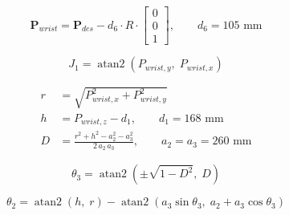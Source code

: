 \documentclass[border=10pt]{standalone}
\begin{document}
\[
\mathbf{P}_{wrist} = \mathbf{P}_{des} - d_6 \cdot R \cdot \begin{bmatrix}0\\0\\1\end{bmatrix},
\qquad d_6 = 105\text{ mm}
\]

\bigskip

\[
J_1 = \operatorname{atan2}(P_{wrist,y},\; P_{wrist,x})
\]

\bigskip

\[
\begin{aligned}
r &= \sqrt{P_{wrist,x}^2 + P_{wrist,y}^2} \\
h &= P_{wrist,z} - d_1, \qquad d_1 = 168\text{ mm} \\
D &= \frac{r^2 + h^2 - a_2^2 - a_3^2}{2\,a_2\,a_3}, \qquad a_2 = a_3 = 260\text{ mm}
\end{aligned}
\]

\[
\theta_3 = \operatorname{atan2}\!\left(\pm\sqrt{1-D^2},\;D\right)
\]

\[
\theta_2 = \operatorname{atan2}(h,\;r) - \operatorname{atan2}\!\left(a_3\sin\theta_3,\;a_2 + a_3\cos\theta_3\right)
\]
\end{document}
